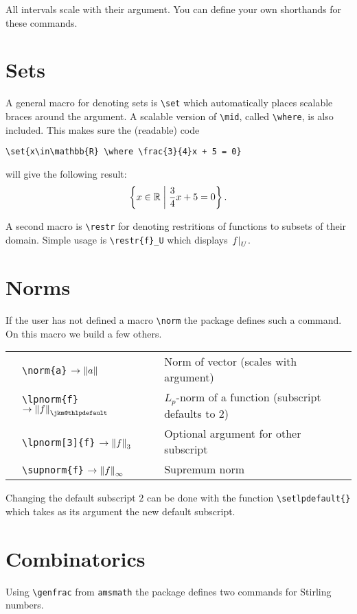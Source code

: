 \documentclass[12pt,a4paper]{article}
\begin{document}
All intervals scale with their argument. You can define your own shorthands for these commands.

\section{Sets}

A general macro for denoting sets is \verb|\set| which automatically places scalable braces around the argument.
A scalable version of \verb|\mid|, called \verb|\where|, is also included.
This makes sure the (readable) code
\begin{verbatim}
\set{x\in\mathbb{R} \where \frac{3}{4}x + 5 = 0}
\end{verbatim}
will give the following result:
\[\left\{x\in\mathbb{R} \mathrel{}\middle|\mathrel{} \frac{3}{4}x + 5 = 0\right\}.\]

A second macro is \verb|\restr| for denoting restritions of functions to subsets of their domain.
Simple usage is \verb|\restr{f}_U| which displays $\left.f\right|_U$.

\section{Norms}

If the user has not defined a macro \verb|\norm| the package defines such a command. On this macro we build a few others.

\begin{longtable}[l]{ l l p{6cm} }
&\verb|\norm{a}| $\displaystyle\rightarrow\norm{a}$ & Norm of vector (scales with argument)\\
&\verb|\lpnorm{f}| $\displaystyle\rightarrow\lpnorm{f}$ & $L_p$-norm of a function (subscript defaults to $2$)\\
&\verb|\lpnorm[3]{f}| $\displaystyle\rightarrow\lpnorm[3]{f}$ & Optional argument for other subscript\\
&\verb|\supnorm{f}| $\displaystyle\rightarrow\supnorm{f}$ & Supremum norm\\
\end{longtable}
Changing the default subscript $2$ can be done with the function \verb|\setlpdefault{}| which takes as its argument the new default subscript.

\section{Combinatorics}

Using \verb|\genfrac| from \verb|amsmath| the package defines two commands for Stirling numbers.
\end{document}
